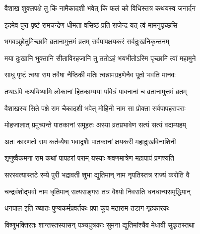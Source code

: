 \genMangalaShloka

\hyperref[sec:ekadashi_mahatmyam_padma_puranam]{\closesub}
\clearpage

\label{sec:padma-vaishakha-shukla-mohini}

\ganapatyadiDhyanam
\padmaPuranam



\twolineshloka
{वैशाख शुक्लपक्षे तु किं नामैकादशी भवेत्}
{किं फलं को विधिस्तत्र कथयस्व जनार्दन}%


\twolineshloka
{इदमेव पुरा पृष्टं रामचन्द्रेण धीमता}
{वसिष्ठं प्रति राजेन्द्र यत् त्वं मामनुपृच्छसि}%


\twolineshloka
{भगवञ्छ्रोतुमिच्छामि व्रतानामुत्तमं व्रतम्}
{सर्वपापक्षयकरं सर्वदुःखनिकृन्तनम्}%

\twolineshloka
{मया दुःखानि भुक्तानि सीताविरहजानि तु}
{ततोऽहं भयभीतोऽस्मि पृच्छामि त्वां महामुने}%


\twolineshloka
{साधु पृष्टं त्वया राम तवैषा नैष्ठिकी मतिः}
{त्वन्नामग्रहणेनैव पूतो भवति मानवः}%

\twolineshloka
{तथाऽपि कथयिष्यामि लोकानां हितकाम्यया}
{पवित्रं पावनानां च व्रतानामुत्तमं व्रतम्}%

\twolineshloka
{वैशाखस्य सिते पक्षे राम चैकादशी भवेत्}
{मोहिनी नाम सा प्रोक्ता सर्वपापहरापराः}%

\twolineshloka
{मोहजालात् प्रमुच्यन्ते पातकानां समूहतः}
{अस्या व्रतप्रभावेण सत्यं सत्यं वदाम्यहम्}%

\twolineshloka
{अतः कारणतो राम कर्तव्यैषा भवादृशैः}
{पातकानां क्षयकरी महादुःखविनाशिनी}%

\twolineshloka
{शृणुष्वैकमना राम कथां पापहरां पराम्}
{यस्याः श्रवणमात्रेण महापापं प्रणश्यति}%

\twolineshloka
{सरस्वत्यास्तटे रम्ये पुरी भद्रावती शुभा}
{द्युतिमान् नाम नृपतिस्तत्र राज्यं करोति वै}%

\twolineshloka
{चन्द्रवंशोद्भवो नाम धृतिमान् सत्यसङ्गरः}
{तत्र वैश्यो निवसति धनधान्यसमृद्धिमान्}%

\twolineshloka
{धनपाल इति ख्यातः पुण्यकर्मप्रवर्तकः}
{प्रपा कूप मठाराम तडाग गृहकारकः}%

\twolineshloka
{विष्णुभक्तिरतः शान्तस्तस्यासन् पञ्चपुत्रकाः}
{सुमना द्युतिमांश्चैव मेधावी सुकृतस्तथा}%

